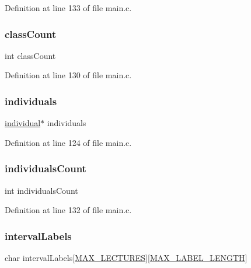 Definition at line 133 of file main.\+c.

\hypertarget{structparams_ab24cae7eb61eafa1eab4b60a637dcd54}{}\label{structparams_ab24cae7eb61eafa1eab4b60a637dcd54} 
\subsubsection{\texorpdfstring{class\+Count}{classCount}}
{\footnotesize\ttfamily int class\+Count}



Definition at line 130 of file main.\+c.

\hypertarget{structparams_a34fb92547357a1c7f92c3a6fabb2f80a}{}\label{structparams_a34fb92547357a1c7f92c3a6fabb2f80a} 
\subsubsection{\texorpdfstring{individuals}{individuals}}
{\footnotesize\ttfamily \hyperlink{structindividual}{individual}$\ast$ individuals}



Definition at line 124 of file main.\+c.

\hypertarget{structparams_aeca69d2fb21ed26b662e49d760c2e332}{}\label{structparams_aeca69d2fb21ed26b662e49d760c2e332} 
\subsubsection{\texorpdfstring{individuals\+Count}{individualsCount}}
{\footnotesize\ttfamily int individuals\+Count}



Definition at line 132 of file main.\+c.

\hypertarget{structparams_a0f99e938bd12ec5d93841fe380ed9e82}{}\label{structparams_a0f99e938bd12ec5d93841fe380ed9e82} 
\subsubsection{\texorpdfstring{interval\+Labels}{intervalLabels}}
{\footnotesize\ttfamily char interval\+Labels\mbox{[}\hyperlink{main_8c_a152499a7a91751df0c7f203a60a88003}{M\+A\+X\+\_\+\+L\+E\+C\+T\+U\+R\+ES}\mbox{]}\mbox{[}\hyperlink{main_8c_a40953fb1d014188b77bbf6d21d0b3e6c}{M\+A\+X\+\_\+\+L\+A\+B\+E\+L\+\_\+\+L\+E\+N\+G\+TH}\mbox{]}}



